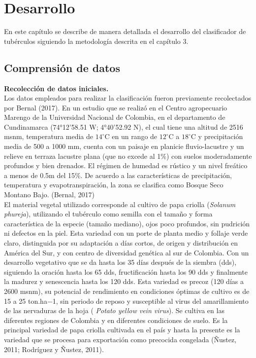 \chapter{Desarrollo}

En este capítulo se describe de manera detallada el desarrollo del clasificador de tubérculos siguiendo la metodología descrita en el capítulo 3.
\noindent
\section{Comprensión de datos}

\noindent
\textbf{Recolección de datos iniciales.}\\

Los datos empleados para realizar la clasificación fueron previamente recolectados por Bernal (2017). En un estudio que se realizó en el Centro agropecuario Marengo de la Universidad Nacional de Colombia, en el departamento de Cundinamarca (74°12'58.51 W; 4°40'52.92 N), el cual tiene una altitud de 2516 msnm, temperatura media de $14^\circ$C  en un rango de $12^\circ$C  a $18^\circ$C  y precipitación media de 500 a 1000 mm, cuenta con un paisaje en planicie fluvio-lacustre y un relieve en terraza lacustre plana (que no excede al 1\%) con suelos moderadamente profundos y bien drenados. El régimen de humedad es rústico y un nivel freático a menos de 0.5m del 15\%. De acuerdo a las características de precipitación, temperatura y evapotranspiración, la zona se clasifica como Bosque Seco Montano Bajo. (Bernal, 2017)\\

El material vegetal utilizado corresponde al cultivo de papa criolla (\textit{Solanum phureja}), utilizando el tubérculo como semilla con el tamaño y forma característica de la especie (tamaño mediano), ojos poco profundos, sin pudrición ni defectos en la piel. Esta variedad con un porte de planta medio y follaje verde claro, distinguida por su adaptación a días cortos, de origen y distribución en América del Sur, y con centro de diversidad genética al sur de Colombia. Con un desarrollo vegetativo que se da hasta los 35 días después de la siembra (dds), siguiendo la oración hasta los 65 dds, fructificación hasta los 90 dds y finalmente la madurez y senescencia hasta los 120 dds. Esta variedad es precoz (120 días a 2600 msnm), su potencial de rendimiento en condiciones óptimas de cultivo es de 15 a 25 ton.ha−1, sin periodo de reposo y susceptible al virus del amarillamiento de las nervaduras de la hoja ( \textit{Potato yellow vein virus}). Se cultiva en las diferentes regiones de Colombia y en diferentes condiciones de suelo. Es la principal variedad de papa criolla cultivada en el país y hasta la presente es la variedad que se procesa para exportación como precocida congelada (Ñustez, 2011; Rodríguez y Ñustez, 2011).\\

